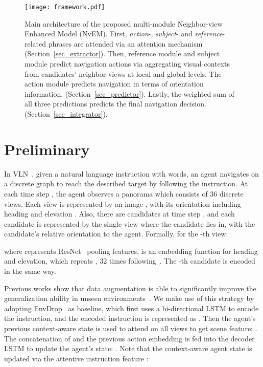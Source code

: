 \documentclass[sigconf]{acmart}
\begin{document}
\begin{figure*}[!htbp]
	\centering
	\texttt{[image: framework.pdf]}
	\vspace{-6mm}
	\caption{Main architecture of the proposed multi-module Neighbor-view Enhanced Model (NvEM).
First, \textit{action}-, \textit{subject}- and \textit{reference}-related phrases are attended via an attention mechanism (Section~\ref{sec_extractor}). 
Then, reference module and subject module predict navigation actions via aggregating visual contexts from candidates' neighbor views at local and global levels. The action module predicts navigation in terms of orientation information. (Section~\ref{sec_predictor}). 
Lastly, the weighted sum of all three predictions predicts the final navigation decision. (Section~\ref{sec_integrator}).}
	\label{fig_framework}
\end{figure*}
\section{Preliminary}
In VLN~\cite{anderson2018vln}, given a natural language instruction with  words, an agent navigates on a discrete graph to reach the described target by following the instruction. 
At each time step , the agent observes a panorama which consists of 36 discrete views. 
Each view is represented by an image , with its orientation including heading  and elevation . 
Also, there are  candidates at time step , and each candidate is represented by the single view where the candidate lies in, with the candidate's relative orientation to the agent. Formally, for the -th view:

where  represents ResNet~\cite{he2016resnet} pooling features,  is an embedding function for heading and elevation, which repeats ,  32 times following~\cite{tan2019envdrop}. The -th candidate  is encoded in the same way.

Previous works show that data augmentation is able to significantly improve the generalization ability in unseen environments~\cite{fried2018speaker,tan2019envdrop}. 
We make use of this strategy by adopting EnvDrop~\cite{tan2019envdrop} as baseline, which first uses a bi-directional LSTM to encode the instruction, and the encoded instruction is represented as .
Then the agent's previous context-aware state  is used to attend on all views to get scene feature: .
The concatenation of  and the previous action embedding  is fed into the decoder LSTM to update the agent's state: . 
Note that the context-aware agent state is updated via the attentive instruction feature :
\end{document}
